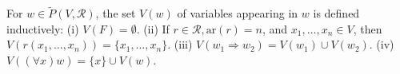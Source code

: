 For $w \in \tilde{P}(V, \mathcal{R})$, the set $V(w)$ of variables appearing in $w$ is defined inductively: (i) $V(F) = \emptyset$. (ii) If $r \in \mathcal{R}, \text{ar}(r)=n$, and $x_1,\ldots,x_n \in V$, then $V(r(x_1,\ldots,x_n)) = \{x_1,\ldots,x_n\}$. (iii) $V(w_1 \Rightarrow w_2) = V(w_1) \cup V(w_2)$. (iv) $V((\forall x)w) = \{x\} \cup V(w)$.

